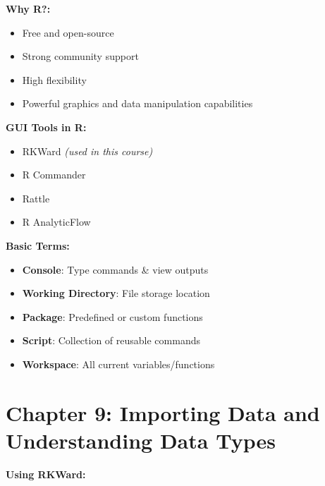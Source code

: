 \documentclass[
  letterpaper,
  DIV=11,
  numbers=noendperiod]{scrreprt}
\providecommand{\tightlist}{%
  \setlength{\itemsep}{0pt}\setlength{\parskip}{0pt}}
\begin{document}
\textbf{Why R?:}

\begin{itemize}
\tightlist
\item
  Free and open-source\\
\item
  Strong community support\\
\item
  High flexibility\\
\item
  Powerful graphics and data manipulation capabilities
\end{itemize}

\textbf{GUI Tools in R:}

\begin{itemize}
\tightlist
\item
  RKWard \emph{(used in this course)}\\
\item
  R Commander\\
\item
  Rattle\\
\item
  R AnalyticFlow
\end{itemize}

\textbf{Basic Terms:}

\begin{itemize}
\tightlist
\item
  \textbf{Console}: Type commands \& view outputs\\
\item
  \textbf{Working Directory}: File storage location\\
\item
  \textbf{Package}: Predefined or custom functions\\
\item
  \textbf{Script}: Collection of reusable commands\\
\item
  \textbf{Workspace}: All current variables/functions
\end{itemize}


\chapter{Chapter 9: Importing Data and Understanding Data
Types}\label{chapter-9-importing-data-and-understanding-data-types}

\textbf{Using RKWard:}
\end{document}
